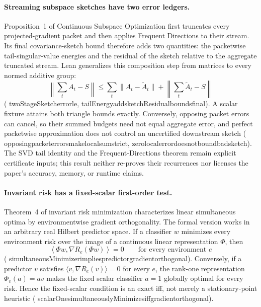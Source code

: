 \documentclass[11pt]{article}
\newcommand{\leanname}[1]{{\scriptsize\ttfamily
  \def\_{\textunderscore\allowbreak}#1}}
\begin{document}
\paragraph{Streaming subspace sketches have two error ledgers.}
Proposition~1 of Continuous Subspace Optimization
\cite{cheng2025coso} first truncates every projected-gradient packet and then
applies Frequent Directions to their stream.  Its final covariance-sketch
bound therefore adds two quantities: the packetwise tail-singular-value
energies and the residual of the sketch relative to the aggregate truncated
stream.  Lean generalizes this composition step from matrices to every normed
additive group:
\[
 \left\lVert\sum_t A_t-S\right\rVert
 \leq \sum_t \lVert A_t-\widetilde A_t\rVert
      +\left\lVert\sum_t\widetilde A_t-S\right\rVert
\]
(\leanname{twoStageSketch\_error\_le},
\leanname{tailEnergy\_add\_sketchResidual\_bounds\_final}).
A scalar fixture attains both triangle bounds exactly.  Conversely, opposing
packet errors can cancel, so their summed budgets need not equal aggregate
error, and perfect packetwise approximation does not control an uncertified
downstream sketch
(\leanname{opposing\_packet\_errors\_make\_local\_sum\_strict},
\leanname{zero\_local\_error\_does\_not\_bound\_bad\_sketch}).
The SVD tail identity and the Frequent-Directions theorem remain explicit
certificate inputs; this result neither re-proves their recurrences nor
licenses the paper's accuracy, memory, or runtime claims.

\paragraph{Invariant risk has a fixed-scalar first-order test.}
Theorem~4 of invariant risk minimization
\cite{arjovsky2019irm} characterizes linear simultaneous optima by
environmentwise gradient orthogonality.  The formal version works in an
arbitrary real Hilbert predictor space.  If a classifier $w$ minimizes every
environment risk over the image of a continuous linear representation
$\Phi$, then
\[
  \left\langle \Phi w,\nabla R_e(\Phi w)\right\rangle=0
  \qquad\text{for every environment }e
\]
(\leanname{simultaneousMinimizer\_implies\_predictor\_gradient\_orthogonal}).
Conversely, if a predictor $v$ satisfies
$\langle v,\nabla R_e(v)\rangle=0$ for every $e$, the rank-one
representation $\Phi_v(a)=av$ makes the fixed scalar classifier $a=1$
globally optimal for every risk.  Hence the fixed-scalar condition is an
exact iff, not merely a stationary-point heuristic
(\leanname{scalarOne\_simultaneouslyMinimizes\_iff\_gradient\_orthogonal}).
\end{document}
